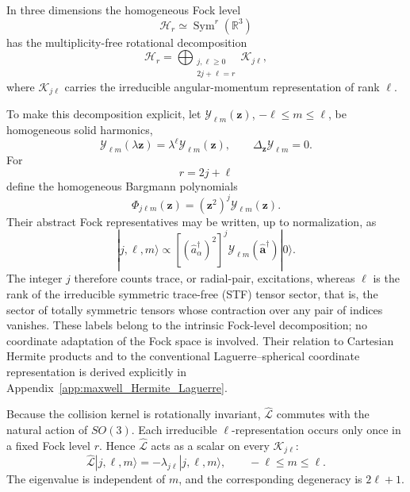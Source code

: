 \documentclass[11pt,oneside]{article}
\numberwithin{equation}{section}
\theoremstyle{definition}
\begin{document}
In three dimensions the homogeneous Fock level
\begin{equation}
\mathscr H_r
\simeq
\operatorname{Sym}^r(\mathbb R^3)
\end{equation}
has the multiplicity-free rotational decomposition
\begin{equation}
\mathscr H_r
=
\bigoplus_{\substack{j,\ell\geq0\\2j+\ell=r}}
\mathscr K_{j\ell},
\label{eq:maxwell_Fock_SO3_decomposition}
\end{equation}
where $\mathscr K_{j\ell}$ carries the irreducible angular-momentum
representation of rank $\ell$.

To make this decomposition explicit, let
$\mathcal Y_{\ell m}(\bm z)$,
$-\ell\leq m\leq\ell$, be homogeneous solid harmonics,
\begin{equation}
\mathcal Y_{\ell m}(\lambda\bm z)
=
\lambda^\ell\mathcal Y_{\ell m}(\bm z),
\qquad
\Delta_{\bm z}\mathcal Y_{\ell m}=0.
\end{equation}
For
\begin{equation}
r=2j+\ell
\end{equation}
define the homogeneous Bargmann polynomials
\begin{equation}
\Phi_{j\ell m}(\bm z)
=
(\bm z^2)^j
\mathcal Y_{\ell m}(\bm z).
\label{eq:maxwell_Fock_spherical_Bargmann_basis}
\end{equation}
Their abstract Fock representatives may be written, up to normalization,
as
\begin{equation}
|j,\ell,m\rangle
\propto
\left[
(\hat a_\alpha^\dagger)^2
\right]^j
\mathcal Y_{\ell m}(\hat{\bm a}^\dagger)|0\rangle .
\label{eq:maxwell_Fock_spherical_states}
\end{equation}
The integer $j$ therefore counts trace, or radial-pair, excitations,
whereas $\ell$ is the rank of the irreducible symmetric trace-free (STF) tensor sector, that is, the sector of totally symmetric tensors whose contraction over any pair of indices vanishes.  These labels belong to the intrinsic Fock-level decomposition; no coordinate adaptation of the Fock space is involved.  Their relation to Cartesian Hermite products and to the conventional Laguerre--spherical coordinate representation is derived explicitly in Appendix~\ref{app:maxwell_Hermite_Laguerre}.

Because the collision kernel is rotationally invariant,
$\widehat{\mathcal L}$ commutes with the natural action of $SO(3)$.
Each irreducible $\ell$-representation occurs only once in a fixed
Fock level $r$.  Hence
$\widehat{\mathcal L}$ acts as a scalar on every
$\mathscr K_{j\ell}$:
\begin{equation}
\widehat{\mathcal L}|j,\ell,m\rangle
=
-\lambda_{j\ell}|j,\ell,m\rangle,
\qquad
-\ell\leq m\leq\ell .
\label{eq:maxwell_full_spectrum_eigenvalue_def}
\end{equation}
The eigenvalue is independent of $m$, and the corresponding degeneracy is
$2\ell+1$.
\end{document}
